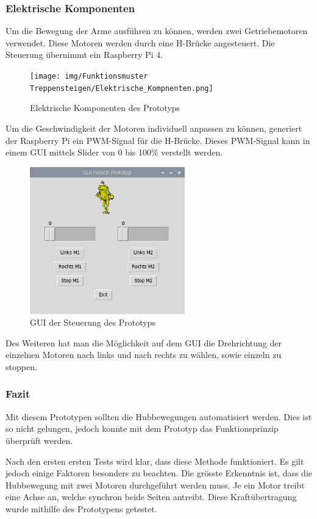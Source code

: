 \subsubsection{Elektrische Komponenten}
Um die Bewegung der Arme ausführen zu können, werden zwei Getriebemotoren verwendet. Diese Motoren werden durch eine H-Brücke angesteuert. Die Steuerung übernimmt ein Raspberry Pi 4. 

\begin{figure}[h]
  \texttt{[image: img/Funktionsmuster Treppensteigen/Elektrische\_Kompnenten.png]}
  \centering
  \caption{Elektrische Komponenten des Prototyps}
\end{figure}

Um die Geschwindigkeit der Motoren individuell anpassen zu können, generiert der Raspberry Pi ein PWM-Signal für die H-Brücke. Dieses PWM-Signal kann in einem GUI mittels Slider von 0 bis 100\% verstellt werden. 
\newpage

\begin{figure}[h]
  \includegraphics[width=0.6\textwidth]{img/Funktionsmuster Treppensteigen/GUI_Prototyp.png}
  \centering
  \caption{GUI der Steuerung des Prototyps}
\end{figure}

Des Weiteren hat man die Möglichkeit auf dem GUI die Drehrichtung der einzelnen Motoren nach links und nach rechts zu wählen, sowie einzeln zu stoppen.

\subsubsection{Fazit}

Mit diesem Prototypen sollten die Hubbewegungen automatisiert werden. Dies ist so nicht gelungen, jedoch konnte mit dem Prototyp das Funktionsprinzip überprüft werden.

Nach den ersten ersten Tests wird klar, dass diese Methode funktioniert. Es gilt jedoch einige Faktoren besonders zu beachten. Die grösste Erkenntnis ist, dass die Hubbewegung mit zwei Motoren durchgeführt werden muss. Je ein Motor treibt eine Achse an, welche synchron beide Seiten antreibt. Diese Kraftübertragung wurde mithilfe des Prototypens getestet. 